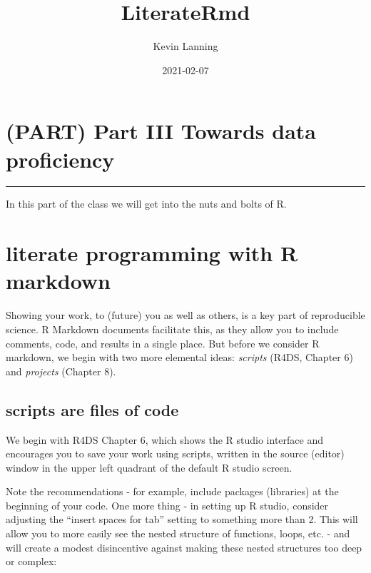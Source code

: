 \documentclass[
]{article}
\title{LiterateRmd}
\author{Kevin Lanning}
\date{2021-02-07}
\begin{document}
\maketitle

\hypertarget{part-part-iii-towards-data-proficiency}{%
\section*{(PART) Part III Towards data
proficiency}\label{part-part-iii-towards-data-proficiency}}

\begin{center}\rule{0.5\linewidth}{0.5pt}\end{center}

In this part of the class we will get into the nuts and bolts of R.

\hypertarget{literate-programming-with-r-markdown}{%
\section{literate programming with R
markdown}\label{literate-programming-with-r-markdown}}

Showing your work, to (future) you as well as others, is a key part of
reproducible science. R Markdown documents facilitate this, as they
allow you to include comments, code, and results in a single place. But
before we consider R markdown, we begin with two more elemental ideas:
\emph{scripts} (R4DS, Chapter 6) and \emph{projects} (Chapter 8).

\hypertarget{scripts-are-files-of-code}{%
\subsection{scripts are files of code}\label{scripts-are-files-of-code}}

We begin with R4DS Chapter 6, which shows the R studio interface and
encourages you to save your work using scripts, written in the source
(editor) window in the upper left quadrant of the default R studio
screen.

Note the recommendations - for example, include packages (libraries) at
the beginning of your code. One more thing - in setting up R studio,
consider adjusting the ``insert spaces for tab'' setting to something
more than 2. This will allow you to more easily see the nested structure
of functions, loops, etc. - and will create a modest disincentive
against making these nested structures too deep or complex:
\end{document}

